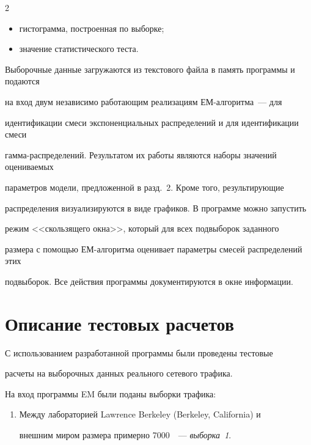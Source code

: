 \begin{multicols}{2}
\begin{itemize}
\item гистограмма, построенная по выборке;


\item значение статистического теста.


\end{itemize}





Выборочные данные загружаются из текстового файла в память программы и подаются


на вход двум независимо работающим реализациям ЕМ-алгоритма~--- для


идентификации смеси экспоненциальных распределений и для идентификации смеси


гамма-распределений. Результатом их работы являются наборы значений оцениваемых


параметров модели, предложенной в разд.~2. Кроме того, результирующие


распределения визуализируются в виде графиков. В программе можно запустить


режим <<скользящего окна>>, который для всех подвыборок заданного


размера с помощью ЕМ-алгоритма оценивает параметры смесей распределений этих


подвыборок. Все действия программы документируются в окне информации.





\section{Описание тестовых расчетов}





С использованием разработанной программы были проведены тестовые


расчеты на выборочных данных реального сетевого трафика.





На вход программы EM были поданы выборки трафика:


\begin{enumerate}[I]


\item Между лабораторией Lawrence Berkeley (Berkeley, California) и


внешним миром размера примерно 7000~\cite{8bat}~--- \textit{выборка~1}.



\end{enumerate}
\end{multicols}
